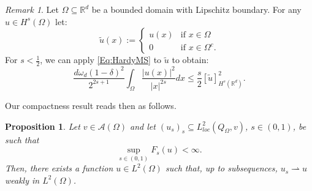 \documentclass[reqno,11pt]{amsart}
\numberwithin{equation}{section}
\theoremstyle{definition} %
\theoremstyle{plain}
\newtheorem{prop}[prop]{Proposition}
\theoremstyle{definition}
\theoremstyle{remark}
\newtheorem{remark}[remark]{Remark}
\def\O{\Omega}
\def\R{\mathbb{R}}
\begin{document}
\begin{remark}
    Let $\O\subseteq\R^d$ be a bounded domain with Lipschitz boundary. For any $u\in H^s(\O)$ let:
     \begin{equation*}
        \tilde{u}(x):=
        \begin{cases}
            u(x)& \text{if } x\in\O\\
            0 & \text{if } x\in\O^c.
        \end{cases}
    \end{equation*}
    For $s<\frac12$, we can apply \ref{Eq:HardyMS} to $\tilde{u}$ to obtain:
    \begin{equation}
        \label{Eq:HardyMSOmega}
         \frac{d\omega_d(1-\delta)^2}{2^{2s+1}}\int_{\O}\frac{|u(x)|^2}{|x|^{2s}}dx\leq \frac{s}{2}[\tilde u]_{H^s(\R^d)}^2.
    \end{equation}
\end{remark}
Our compactness result reads then as follows.
\begin{prop}
\label{prop:compactness}
    Let $v\in\mathcal{A}(\O)$ and let $(u_s)_s\subseteq L^2_{loc}(Q_\O,v)$, $s\in(0,1)$, be such that
    \begin{equation*}
        \sup_{s\in(0,1)}F_s(u)<\infty.
    \end{equation*}
    Then, there exists a function $u\in L^2(\O)$ such that, up to subsequences, $u_s\rightharpoonup u$ weakly in $L^2(\O)$.
\end{prop}
\end{document}
